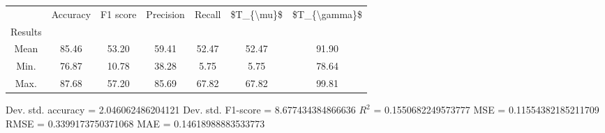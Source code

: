 \begin{tabular}{|c|c|c|c|c|c|c|}
\toprule
{} &  Accuracy &  F1 score &  Precision &  Recall &  \$T\_\{\textbackslash mu\}\$ &  \$T\_\{\textbackslash gamma\}\$ \\
Results &           &           &            &         &            &               \\
\hline
Mean    &     85.46 &     53.20 &      59.41 &   52.47 &      52.47 &         91.90 \\
Min.    &     76.87 &     10.78 &      38.28 &    5.75 &       5.75 &         78.64 \\
Max.    &     87.68 &     57.20 &      85.69 &   67.82 &      67.82 &         99.81 \\
\bottomrule
\end{tabular}

 Dev. std. accuracy = 2.046062486204121
 Dev. std. F1-score = 8.677434384866636
 $R^2$ = 0.1550682249573777
 MSE = 0.11554382185211709
 RMSE = 0.3399173750371068
 MAE = 0.14618988883533773